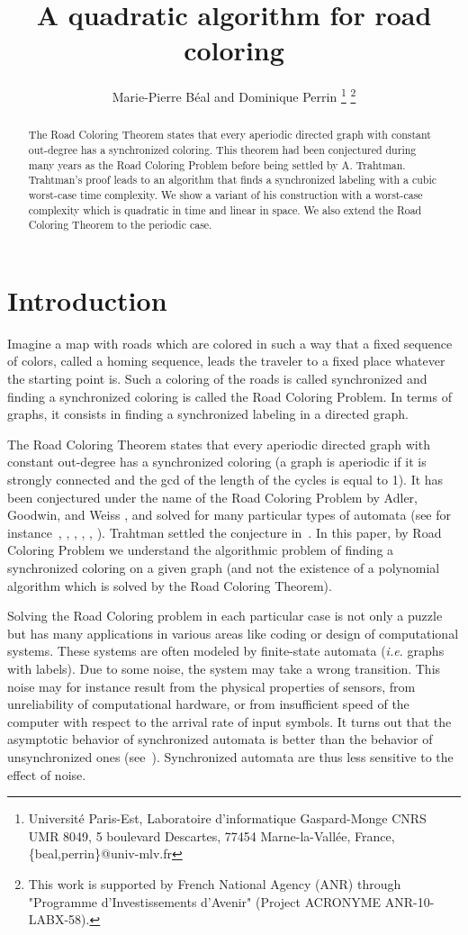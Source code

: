 \documentclass[11pt,a4paper]{article}
\title{A quadratic algorithm for road coloring}
\author{Marie-Pierre B{\'e}al and Dominique Perrin
  \thanks{Universit\'e Paris-Est, Laboratoire d'informatique
    Gaspard-Monge CNRS UMR 8049, 5 boulevard Descartes, 77454
    Marne-la-Vall\'ee, France,
    \{beal,perrin\}@univ-mlv.fr}
    \thanks{This work is supported by
    French National Agency (ANR) through "Programme d'Investissements
    d'Avenir" (Project ACRONYME ANR-10-LABX-58).}  }
\newcommand{\ie}{{\itshape i.e.}\xspace }
\begin{document}
\maketitle


\begin{abstract}
  The Road Coloring Theorem states that every aperiodic directed graph
  with constant out-degree has a synchronized coloring. This theorem
  had been conjectured during many years as the Road Coloring Problem
  before being settled by A. Trahtman. Trahtman's proof leads to an
  algorithm that finds a synchronized labeling with a cubic worst-case
  time complexity.  We show a variant of his construction with a
  worst-case complexity which is quadratic in time and linear in
  space. We also extend the Road Coloring Theorem to the periodic
  case.
\end{abstract}
\section{Introduction}

Imagine a map with roads which are colored in such a way that a fixed
sequence of colors, called a homing sequence, leads the traveler to a
fixed place whatever the starting point is.  Such a coloring of the
roads is called synchronized and finding a synchronized coloring is
called the Road Coloring Problem. In terms of graphs, it consists in
finding a synchronized labeling in a directed graph.

The Road Coloring Theorem states that every aperiodic directed graph
with constant out-degree has a synchronized coloring (a graph is
aperiodic if it is strongly connected and the gcd of the length of the
cycles is equal to 1).  It has been conjectured under the name of the
Road Coloring Problem by Adler, Goodwin, and Weiss
\cite{AdlerGoodwynWeiss77}, and solved for many particular types of
automata (see for instance~\cite{AdlerGoodwynWeiss77},
\cite{OBrien81}, \cite{Carbone01}, \cite{Kari03}, \cite{Friedman90},
\cite{PerrinSchutzenberger92}). Trahtman settled the conjecture
in~\cite{Trahtman09}. In this paper, by Road Coloring Problem we
understand the algorithmic problem of finding a synchronized coloring
on a given graph (and not the existence of a polynomial algorithm
which is solved by the Road Coloring Theorem).


Solving the Road Coloring problem in each particular case is not only
a puzzle but has many applications in various areas like coding or
design of computational systems.  These systems are often modeled by
finite-state automata (\ie graphs with labels).  Due to some noise,
the system may take a wrong transition.  This noise may for instance
result from the physical properties of sensors, from unreliability of
computational hardware, or from insufficient speed of the computer
with respect to the arrival rate of input symbols.  It turns out that
the asymptotic behavior of synchronized automata is better than the
behavior of unsynchronized ones (see~\cite{DelyonMaler94}).
Synchronized automata are thus less sensitive to the effect of noise.
\end{document}
